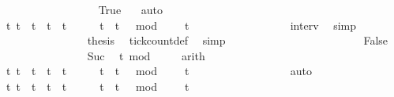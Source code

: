 \begin{isabellebody}
\ \ \ \ \ \ \ \ \ \ \ \ \ \ \ \ \isamarkupfalse%
\ True\ \ \isamarkupfalse%
\ auto\isanewline
\ \ \ \ \ \ \ \ \ \ \ \ \ \ \isamarkupfalse%
\ {\isacartoucheopen}{\isacharbraceleft}t{\isachardot}\ t\ {\isasymle}\ t\ {\isasymand}\ t\ {\isacharless}\ t\ {\isacharplus}\ {}\ {\isasymand}\ {}\ {\isasymle}\ t\ {\isasymand}\ {\isacharparenleft}t\ {\isacharminus}\ {}{\isacharparenright}\ mod\ {}\ {\isacharequal}\ {}{\isacharbraceright}\ {\isacharequal}\ {\isacharbraceleft}t\isanewline
\ \ \ \ \ \ \ \ \ \ \ \ \ \ \ \ \isamarkupfalse%
\ interv{\isacharunderscore}{}\ \isamarkupfalse%
\ simp\isanewline
\ \ \ \ \ \ \ \ \ \ \ \ \ \ \isamarkupfalse%
\ {\isacharquery}thesis\ \isamarkupfalse%
\ tick{\isacharunderscore}count{\isacharunderscore}def\ \isamarkupfalse%
\ simp\isanewline
\ \ \ \ \ \ \ \ \ \ \isamarkupfalse%
\isanewline
\ \ \ \ \ \ \ \ \ \ \ \ \isamarkupfalse%
\ False\isanewline
\ \ \ \ \ \ \ \ \ \ \ \ \ \ \isamarkupfalse%
\ Suc\ \isamarkupfalse%
\ {\isacartoucheopen}t\ mod\ {}\ {\isacharequal}\ {}{\isacartoucheclose}\ \isamarkupfalse%
\ arith\isanewline
\ \ \ \ \ \ \ \ \ \ \ \ \ \ \isamarkupfalse%
\ {\isacartoucheopen}{\isacharbraceleft}t{\isachardot}\ {\isacharparenleft}t\ {\isacharequal}\ t\ {\isasymor}\ t\ {\isacharequal}\ t\ {\isacharplus}\ {}{\isacharparenright}\ {\isasymand}\ {}\ {\isasymle}\ t\ {\isasymand}\ {\isacharparenleft}t\ {\isacharminus}\ {}{\isacharparenright}\ mod\ {}\ {\isacharequal}\ {}{\isacharbraceright}\ {\isacharequal}\ {\isacharbraceleft}t\isanewline
\ \ \ \ \ \ \ \ \ \ \ \ \ \ \ \ \isamarkupfalse%
\ auto\ \isanewline
\ \ \ \ \ \ \ \ \ \ \ \ \ \ \isamarkupfalse%
\ {\isacartoucheopen}{\isacharbraceleft}t{\isachardot}\ t\ {\isasymle}\ t\ {\isasymand}\ t\ {\isacharless}\ t\ {\isacharplus}\ {}\ {\isasymand}\ {}\ {\isasymle}\ t\ {\isasymand}\ {\isacharparenleft}t\ {\isacharminus}\ {}{\isacharparenright}\ mod\ {}\ {\isacharequal}\ {}{\isacharbraceright}\ {\isacharequal}\ {\isacharbraceleft}t\isanewline

\end{isabellebody}
